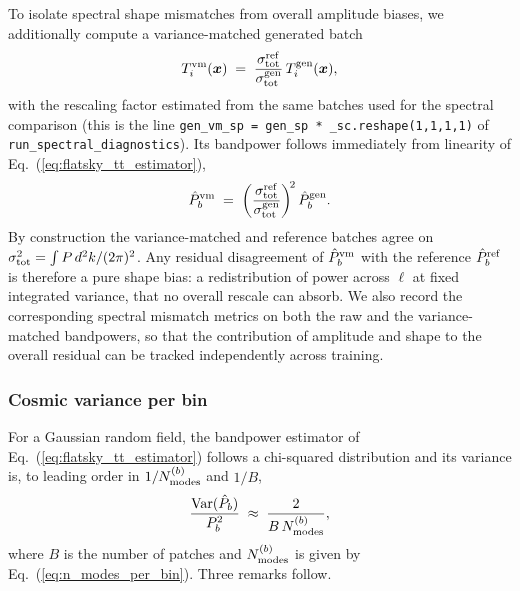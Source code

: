 \documentclass[11pt]{article}
\newcommand{\Var}{\mathrm{Var}}
\theoremstyle{definition}
\begin{document}
To isolate spectral shape mismatches from overall amplitude biases, we additionally compute a variance-matched generated batch
\begin{equation}
  T^{\rm vm}_i(\bm x)\;=\;\frac{\sigma^{\rm ref}_{\rm tot}}{\sigma^{\rm gen}_{\rm tot}}\,T^{\rm gen}_i(\bm x),
  \label{eq:vm_field}
\end{equation}
with the rescaling factor estimated from the same batches used for the spectral comparison (this is the line \texttt{gen\_vm\_sp = gen\_sp * \_sc.reshape(1,1,1,1)} of \texttt{run\_spectral\_diagnostics}). Its bandpower follows immediately from linearity of Eq.~(\ref{eq:flatsky_tt_estimator}),
\begin{equation}
  \hat P^{\rm vm}_b
  \;=\;\biggl(\frac{\sigma^{\rm ref}_{\rm tot}}{\sigma^{\rm gen}_{\rm tot}}\biggr)^{\!2}\,\hat P^{\rm gen}_b.
  \label{eq:vm_bandpower}
\end{equation}
By construction the variance-matched and reference batches agree on $\sigma_{\rm tot}^2=\int P\,d^2k/(2\pi)^2$. Any residual disagreement of $\hat P^{\rm vm}_b$ with the reference $\hat P^{\rm ref}_b$ is therefore a pure shape bias: a redistribution of power across $\ell$ at fixed integrated variance, that no overall rescale can absorb. We also record the corresponding spectral mismatch metrics on both the raw and the variance-matched bandpowers, so that the contribution of amplitude and shape to the overall residual can be tracked independently across training.
\subsubsection{Cosmic variance per bin}
\label{sec:fm_diag_cosmic_variance}

For a Gaussian random field, the bandpower estimator of Eq.~(\ref{eq:flatsky_tt_estimator}) follows a chi-squared distribution and its variance is, to leading order in $1/N^{(b)}_{\rm modes}$ and $1/B$,
\begin{equation}
  \frac{\Var(\hat P_b)}{P_b^2}
  \;\approx\;\frac{2}{B\,N^{(b)}_{\rm modes}},
  \label{eq:cosmic_variance_per_bin}
\end{equation}
where $B$ is the number of patches and $N^{(b)}_{\rm modes}$ is given by Eq.~(\ref{eq:n_modes_per_bin}). Three remarks follow.
\end{document}
